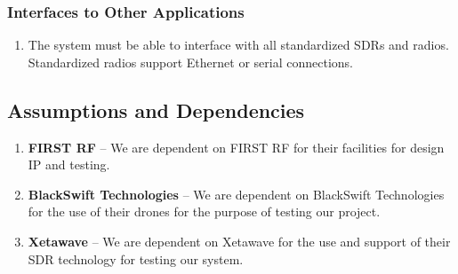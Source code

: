 \documentclass[ProjectRequirements.tex]{subfiles}
\begin{document}
		\subsubsection{Interfaces to Other Applications}
			\begin{enumerate}
				\item The system must be able to interface with all standardized SDRs and radios.  Standardized radios support Ethernet or serial connections.
				
			\end{enumerate}

		
	\subsection{Assumptions and Dependencies}
		\begin{enumerate}
				\item \textbf{FIRST RF} -- We are dependent on FIRST RF for their facilities for design IP and testing.  
				\item \textbf{BlackSwift Technologies} -- We are dependent on BlackSwift Technologies for the use of their drones for the purpose of testing our project.  
				\item \textbf{Xetawave} -- We are dependent on Xetawave for the use and support of their SDR technology for testing our system.
		\end{enumerate}
\end{document}
